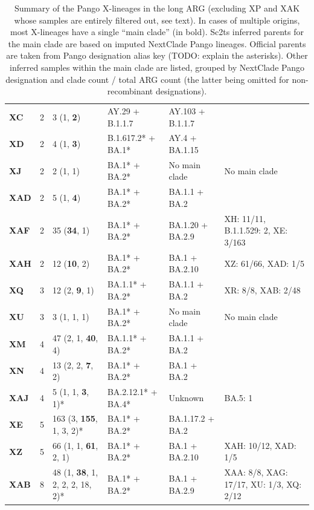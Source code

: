 \documentclass{article}
\begin{document}
\begin{table}
\begin{tabular}{p{1cm}p{1.2cm}p{4.2cm}lll}
\bfseries XC & 2 & 3 (1, \textbf{2}) & AY.29 + B.1.1.7 & AY.103 + B.1.1.7 &  \\
\bfseries XD & 2 & 4 (1, \textbf{3}) & B.1.617.2* + BA.1* & AY.4 + BA.1.15 &  \\
\bfseries XJ & 2 & 2 (1, 1) & BA.1* + BA.2* & No main clade & No main clade \\
\bfseries XAD & 2 & 5 (1, \textbf{4}) & BA.1* + BA.2* & BA.1.1 + BA.2 &  \\
\bfseries XAF & 2 & 35 (\textbf{34}, 1) & BA.1* + BA.2* & BA.1.20 + BA.2.9 & XH: 11/11, B.1.1.529: 2, XE: 3/163 \\
\bfseries XAH & 2 & 12 (\textbf{10}, 2) & BA.1* + BA.2* & BA.1 + BA.2.10 & XZ: 61/66, XAD: 1/5 \\
\bfseries XQ & 3 & 12 (2, \textbf{9}, 1) & BA.1.1* + BA.2* & BA.1.1 + BA.2 & XR: 8/8, XAB: 2/48 \\
\bfseries XU & 3 & 3 (1, 1, 1) & BA.1* + BA.2* & No main clade & No main clade \\
\bfseries XM & 4 & 47 (2, 1, \textbf{40}, 4) & BA.1.1* + BA.2* & BA.1.1 + BA.2 &  \\
\bfseries XN & 4 & 13 (2, 2, \textbf{7}, 2) & BA.1* + BA.2* & BA.1 + BA.2 &  \\
\bfseries XAJ & 4 & 5 (1, 1, \textbf{3}, 1)* & BA.2.12.1* + BA.4* & Unknown & BA.5: 1 \\
\bfseries XE & 5 & 163 (3, \textbf{155}, 1, 3, 2)* & BA.1* + BA.2* & BA.1.17.2 + BA.2 &  \\
\bfseries XZ & 5 & 66 (1, 1, \textbf{61}, 2, 1) & BA.1* + BA.2* & BA.1 + BA.2.10 & XAH: 10/12, XAD: 1/5 \\
\bfseries XAB & 8 & 48 (1, \textbf{38}, 1, 2, 2, 2, 18, 2)* & BA.1* + BA.2* & BA.1 + BA.2.9 & XAA: 8/8, XAG: 17/17, XU: 1/3, XQ: 2/12 \\
\bottomrule
\end{tabular}
\caption{\label{tab:pango-recombinants}
Summary of the Pango X-lineages in the long ARG (excluding XP and XAK whose samples are entirely filtered out, see text). In cases of multiple origins, most X-lineages have a single ``main clade'' (in bold).
Sc2ts inferred parents for the main clade are based on imputed NextClade Pango lineages. Official parents
are taken from Pango designation alias key (TODO: explain the asterisks). Other inferred samples within the main clade are listed, grouped by NextClade Pango designation and clade count / total ARG count (the latter being omitted for non-recombinant designations).
}
\end{table}
\end{document}
